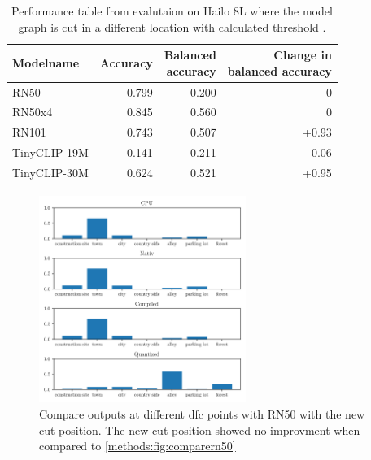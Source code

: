 \begin{table}[h!]
    \centering
    \begin{tabular}{l|rrr}
        \hline
        Modelname & Accuracy &  \makecell{Balanced \\accuracy}&  \makecell{Change in \\balanced accuracy}\\ \hline
        RN50 & 0.799 & 0.200  & 0\\ 
        RN50x4 & 0.845 & 0.560 & 0\\
        RN101 & 0.743& 0.507 & +0.93\\  
        TinyCLIP-19M & 0.141 & 0.211 & -0.06\\ 
        TinyCLIP-30M & 0.624 & 0.521 & +0.95\\ 
    \end{tabular}
    \caption{Performance table from evalutaion on Hailo 8L where the model graph is cut in a different location with calculated threshold .}
    \label{methods:tab:perfHailocutTh}
\end{table}


\begin{figure}[]
    \centering
    \includegraphics[width=0.6\textwidth]{Images/Implementation/compareProbs_newCut_RN50.png}
    \caption{Compare outputs at different \acrshort{dfc} points with RN50 with the new cut position. The new cut position showed no improvment when compared to \cref{methods:fig:comparern50}}
    \label{methods:fig:comparern50newcut}
\end{figure}

